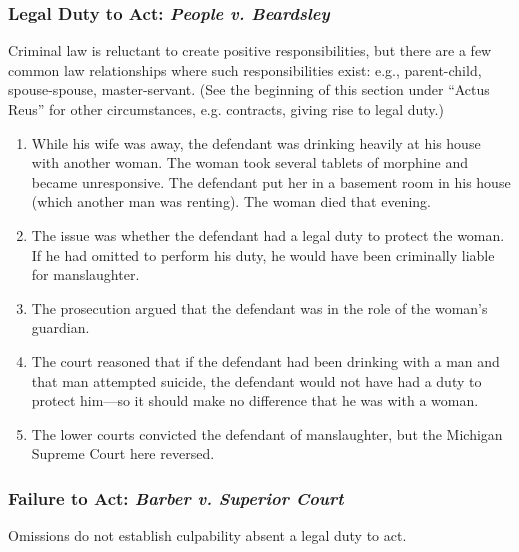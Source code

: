 \subsubsection{Legal Duty to Act: \emph{People v. Beardsley}}

Criminal law is reluctant to create positive responsibilities, but there are a 
few common law relationships where such responsibilities exist: e.g., 
parent-child, spouse-spouse, master-servant. (See the beginning of this 
section under ``Actus Reus'' for other circumstances, e.g. contracts, giving 
rise to legal duty.)

\begin{enumerate}
    \item While his wife was away, the defendant was drinking heavily at his 
    house with another woman. The woman took several tablets of morphine and 
    became unresponsive. The defendant put her in a basement room in his house 
    (which another man was renting). The woman died that evening.
    \item The issue was whether the defendant had a legal duty to protect the 
    woman. If he had omitted to perform his duty, he would have been 
    criminally liable for manslaughter.
    \item The prosecution argued that the defendant was in the 
    role of the woman's guardian.
    \item The court reasoned that if the defendant had been drinking with a 
    man and that man attempted suicide, the defendant would not have had a 
    duty to protect him---so it should make no difference that he was with a 
    woman.
    \item The lower courts convicted the defendant of manslaughter, but the 
    Michigan Supreme Court here reversed.
\end{enumerate}

\subsubsection{Failure to Act: \emph{Barber v. Superior Court}}

Omissions do not establish culpability absent a legal duty to act.

